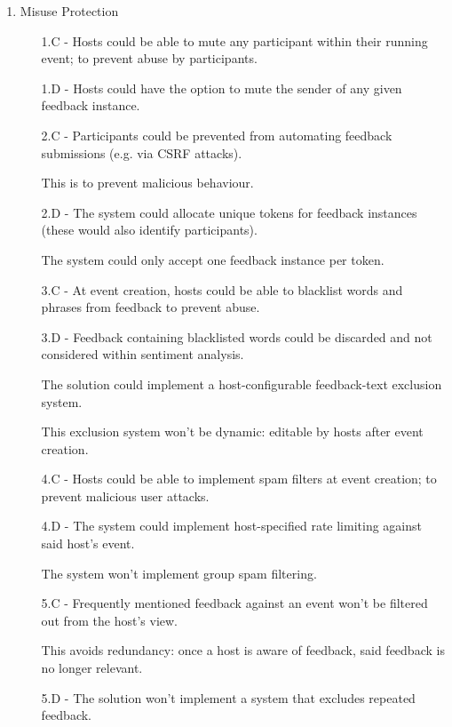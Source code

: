 \documentclass[9pt, titlepage]{extarticle}
\begin{document}
\begin{enumerate}[leftmargin=*]
\item Misuse Protection
\begin{enumerate}[noitemsep, topsep=0pt, leftmargin=9mm]
\item[1.C -] Hosts could be able to mute any participant within their running event; to prevent abuse by participants. 
\item[1.D -] Hosts could have the option to mute the sender of any given feedback instance.
\vspace*{1mm}
\item[2.C -] Participants could be prevented from automating feedback submissions (e.g. via CSRF \autocite{owasp-csrf} attacks). 
\item[] This is to prevent malicious behaviour.
\item[2.D -] The system could allocate unique tokens for feedback instances (these would also identify participants).
\item[] The system could only accept one feedback instance per token. 
\vspace*{1mm}
\item[3.C -] At event creation, hosts could be able to blacklist words and phrases from feedback to prevent abuse.
\item[3.D -] Feedback containing blacklisted words could be discarded and not considered within sentiment analysis.
\item[] The solution could implement a host-configurable feedback-text exclusion system.
\item[] This exclusion system won't be dynamic: editable by hosts after event creation.
\vspace*{1mm}
\item[4.C -] Hosts could be able to implement spam filters at event creation; to prevent malicious user attacks.
\item[4.D -] The system could implement host-specified rate limiting against said host's event.
\item[] The system won't implement group spam filtering.
\vspace*{1mm}
\item[5.C -] Frequently mentioned feedback against an event won't be filtered out from the host's view. 
\item[] This avoids redundancy: once a host is aware of feedback, said feedback is no longer relevant. 
\item[5.D -] The solution won't implement a system that excludes repeated feedback. 
\end{enumerate}

\end{enumerate}
\end{document}
